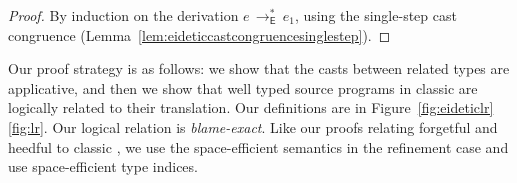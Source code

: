 \documentclass[9pt]{extarticle}
\newcommand{\reflr}{\ifpopl\ref{fig:eideticlr}\else\ref{fig:lr}\fi}
\newcommand{\ottnt}[1]{\mathit{#1}}
\begin{document}
{\begin{lemma}
\begin{center}
  \end{center}
\begin{proof}
    By induction on the derivation $\ottnt{e} \,  \longrightarrow ^{*}_{  \mathsf{E}  }  \, \ottnt{e_{{\mathrm{1}}}}$, using the
    single-step cast congruence
    (Lemma~\ref{lem:eideticcastcongruencesinglestep}).
  \end{proof}
\end{lemma}
\fi}

Our proof strategy is as follows: we show that the casts between
related types are applicative, and then we show that well typed source
programs in classic \lambdah are logically related to their
translation.
Our definitions are in Figure~\reflr. Our logical
relation is \textit{blame-exact}. Like our proofs relating forgetful and
heedful \lambdah to classic \lambdah, we use the space-efficient semantics
in the refinement case and use space-efficient type indices.
\end{document}
